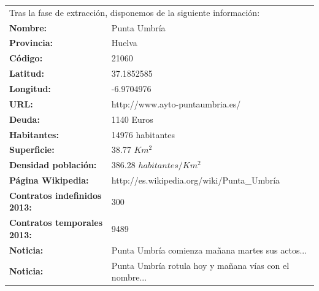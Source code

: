 \begin{center}


\begin{table}[h]
\begin{tabular}{ll}
\multicolumn{2}{l}{Tras la fase de extracción, disponemos de la siguiente información:}                \\
\textbf{Nombre:}                     & Punta Umbría                                                                                    \\
\textbf{Provincia:}                  & Huelva                                                                                          \\
\textbf{Código:}                     & 21060                                                                                           \\
\textbf{Latitud:}                    & 37.1852585                                                                                      \\
\textbf{Longitud:}                   & -6.9704976                                                                                      \\
\textbf{URL:}                        & http://www.ayto-puntaumbria.es/                                                                 \\
\textbf{Deuda:}                      & 1140 Euros                                                                                      \\
\textbf{Habitantes:}                 & 14976 habitantes                                                                                           \\
\textbf{Superficie:}                 & 38.77 $Km^{2}$                                                                                        \\
\textbf{Densidad población:}         & 386.28 $habitantes/Km^{2}$                                                                            \\
\textbf{Página Wikipedia:}           & http://es.wikipedia.org/wiki/Punta\_Umbría                                                      \\
\textbf{Contratos indefinidos 2013:} & 300                                                                                             \\
\textbf{Contratos temporales 2013:}  & 9489                                                                                            \\
\textbf{Noticia:}                    & Punta Umbría comienza mañana martes sus actos... \\
\textbf{Noticia:}                    & Punta Umbría rotula hoy y mañana vías con el nombre...                        
\end{tabular}
\end{table}
\end{center}